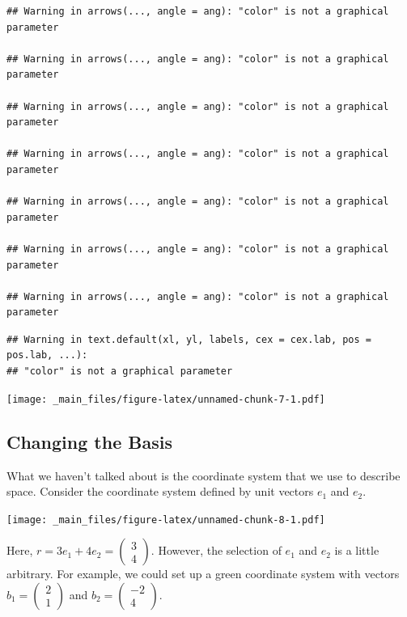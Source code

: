 \documentclass[
]{book}
\theoremstyle{definition}
\theoremstyle{definition}
\theoremstyle{definition}
\theoremstyle{definition}
\theoremstyle{remark}
\begin{document}
\begin{verbatim}
## Warning in arrows(..., angle = ang): "color" is not a graphical parameter

## Warning in arrows(..., angle = ang): "color" is not a graphical parameter

## Warning in arrows(..., angle = ang): "color" is not a graphical parameter

## Warning in arrows(..., angle = ang): "color" is not a graphical parameter

## Warning in arrows(..., angle = ang): "color" is not a graphical parameter

## Warning in arrows(..., angle = ang): "color" is not a graphical parameter

## Warning in arrows(..., angle = ang): "color" is not a graphical parameter
\end{verbatim}

\begin{verbatim}
## Warning in text.default(xl, yl, labels, cex = cex.lab, pos = pos.lab, ...):
## "color" is not a graphical parameter
\end{verbatim}

\texttt{[image: \_main\_files/figure-latex/unnamed-chunk-7-1.pdf]}

\hypertarget{changing-the-basis}{%
\subsection{Changing the Basis}\label{changing-the-basis}}

What we haven't talked about is the coordinate system that we use to describe space. Consider the coordinate system defined by unit vectors \(e_1\) and \(e_2\).

\texttt{[image: \_main\_files/figure-latex/unnamed-chunk-8-1.pdf]}

Here, \(r = 3e_1 + 4e_2 = \begin{pmatrix}3 \\ 4 \end{pmatrix}\). However, the selection of \(e_1\) and \(e_2\) is a little arbitrary. For example, we could set up a green coordinate system with vectors \(b_1 = \begin{pmatrix}2 \\ 1 \end{pmatrix}\) and \(b_2 = \begin{pmatrix} -2\\4\end{pmatrix}\).
\end{document}
